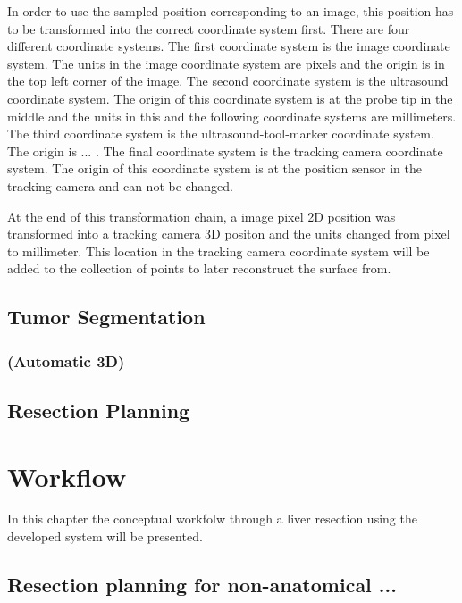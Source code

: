 In order to use the sampled position corresponding to an image, this
position has to be transformed into the correct coordinate system first. There
are four different coordinate systems. The first coordinate system is the image
coordinate system. The units in the image coordinate system are pixels and the
origin is in the top left corner of the image. The
second coordinate system is the ultrasound coordinate system. The origin of this
coordinate system is at the probe tip in the middle and the units in this and
the following coordinate systems are millimeters. The third coordinate system is the
ultrasound-tool-marker coordinate system. The origin is ... . The final
coordinate system is the tracking camera coordinate system. The origin of this
coordinate system is at the position sensor in the tracking camera and can not
be changed.

At the end of this transformation chain, a image pixel 2D position was
transformed into a tracking camera 3D positon and the units changed
from pixel to millimeter. This location in the tracking camera coordinate system
will be added to the collection of points to later reconstruct the surface from.

\subsection{Tumor Segmentation}
\subsubsection{(Automatic 3D)}
\subsection{Resection Planning}
\section{Workflow}
In this chapter the conceptual workfolw through a liver resection using the
developed system will be presented.
\subsection{Resection planning for non-anatomical ...}

